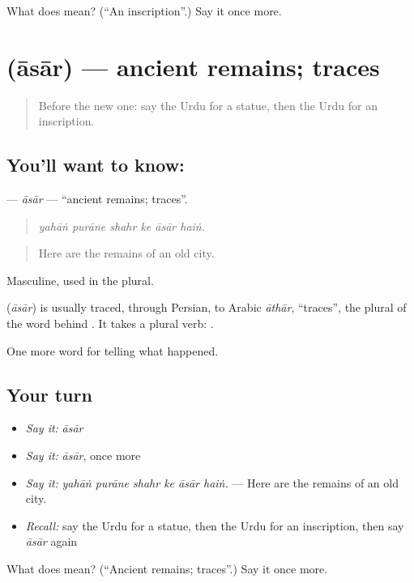 \begin{tcolorbox}[breakable,colback=teal!4,colframe=teal!35!black,title={Before you move on}]
What does  mean? (\textquotedblleft{}An inscription\textquotedblright{}.) Say it once more.
\end{tcolorbox}
\section[\texorpdfstring{\ur{آثار} (āsār)}{آثار (āsār)}]{ (āsār) — ancient remains; traces}

\label{lesson:UR-C314-asar}



\begin{quote}
Before the new one: say the Urdu for a statue, then the Urdu for an inscription.
\end{quote}

\subsection*{You'll want to know: }
\textbf{} — \emph{āsār} — \textquotedblleft{}ancient remains; traces\textquotedblright{}.

\begin{quote}
     
\end{quote}

\begin{quote}
\emph{yahāṅ purāne shahr ke āsār haiṅ.}
\end{quote}

\begin{quote}
Here are the remains of an old city.
\end{quote}

Masculine, used in the plural.

\begin{cousinweb}
\textbf{} (\emph{āsār}) is usually traced, through Persian, to Arabic \emph{āthār}, \textquotedblleft{}traces\textquotedblright{}, the plural of the word behind \textbf{}. It takes a plural verb: \textbf{ }.
\end{cousinweb}

\begin{grammarlens}[title={What you've built}]
One more word for telling what happened.
\end{grammarlens}

\subsection*{Your turn}
\begin{itemize}
\raggedright
  \item \emph{Say it:} \emph{āsār}
  \item \emph{Say it:} \emph{āsār}, once more
  \item \emph{Say it:} \emph{yahāṅ purāne shahr ke āsār haiṅ.} — Here are the remains of an old city.
  \item \emph{Recall:} say the Urdu for a statue, then the Urdu for an inscription, then say \emph{āsār} again
\end{itemize}

\begin{tcolorbox}[breakable,colback=teal!4,colframe=teal!35!black,title={Before you move on}]
What does  mean? (\textquotedblleft{}Ancient remains; traces\textquotedblright{}.) Say it once more.
\end{tcolorbox}
